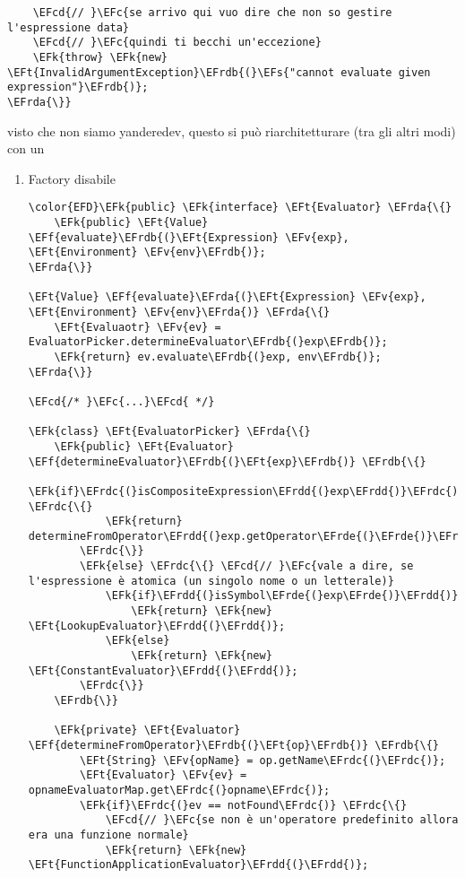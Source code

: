 \documentclass[11pt]{article}
\newcommand{\EFc}[1]{\textcolor{EFc}{#1}} %
\newcommand{\EFcd}[1]{\textcolor{EFcd}{#1}} %
\newcommand{\EFs}[1]{\textcolor{EFs}{#1}} %
\newcommand{\EFk}[1]{\textcolor{EFk}{#1}} %
\newcommand{\EFf}[1]{\textcolor{EFf}{#1}} %
\newcommand{\EFv}[1]{\textcolor{EFv}{#1}} %
\newcommand{\EFt}[1]{\textcolor{EFt}{#1}} %
\newcommand{\EFrda}[1]{\textcolor{EFrda}{#1}} %
\newcommand{\EFrdb}[1]{\textcolor{EFrdb}{#1}} %
\newcommand{\EFrdc}[1]{\textcolor{EFrdc}{#1}} %
\newcommand{\EFrdd}[1]{\textcolor{EFrdd}{#1}} %
\newcommand{\EFrde}[1]{\textcolor{EFrde}{#1}} %
\begin{document}
\begin{enumerate}
\begin{Code}
\begin{Verbatim}
    \EFcd{// }\EFc{se arrivo qui vuo dire che non so gestire l'espressione data}
    \EFcd{// }\EFc{quindi ti becchi un'eccezione}
    \EFk{throw} \EFk{new} \EFt{InvalidArgumentException}\EFrdb{(}\EFs{"cannot evaluate given expression"}\EFrdb{)};
\EFrda{\}}
\end{Verbatim}
\end{Code}
visto che non siamo yanderedev, questo si può riarchitetturare (tra gli altri modi) con un
\begin{enumerate}
\item Factory disabile
\label{sec:org60b07de}
\begin{Code}
\begin{Verbatim}
\color{EFD}\EFk{public} \EFk{interface} \EFt{Evaluator} \EFrda{\{}
    \EFk{public} \EFt{Value} \EFf{evaluate}\EFrdb{(}\EFt{Expression} \EFv{exp}, \EFt{Environment} \EFv{env}\EFrdb{)};
\EFrda{\}}

\EFt{Value} \EFf{evaluate}\EFrda{(}\EFt{Expression} \EFv{exp}, \EFt{Environment} \EFv{env}\EFrda{)} \EFrda{\{}
    \EFt{Evaluaotr} \EFv{ev} = EvaluatorPicker.determineEvaluator\EFrdb{(}exp\EFrdb{)};
    \EFk{return} ev.evaluate\EFrdb{(}exp, env\EFrdb{)};
\EFrda{\}}

\EFcd{/* }\EFc{...}\EFcd{ */}

\EFk{class} \EFt{EvaluatorPicker} \EFrda{\{}
    \EFk{public} \EFt{Evaluator} \EFf{determineEvaluator}\EFrdb{(}\EFt{exp}\EFrdb{)} \EFrdb{\{}
        \EFk{if}\EFrdc{(}isCompositeExpression\EFrdd{(}exp\EFrdd{)}\EFrdc{)} \EFrdc{\{}
            \EFk{return} determineFromOperator\EFrdd{(}exp.getOperator\EFrde{(}\EFrde{)}\EFrdd{)};
        \EFrdc{\}}
        \EFk{else} \EFrdc{\{} \EFcd{// }\EFc{vale a dire, se l'espressione è atomica (un singolo nome o un letterale)}
            \EFk{if}\EFrdd{(}isSymbol\EFrde{(}exp\EFrde{)}\EFrdd{)}
                \EFk{return} \EFk{new} \EFt{LookupEvaluator}\EFrdd{(}\EFrdd{)};
            \EFk{else}
                \EFk{return} \EFk{new} \EFt{ConstantEvaluator}\EFrdd{(}\EFrdd{)};
        \EFrdc{\}}
    \EFrdb{\}}

    \EFk{private} \EFt{Evaluator} \EFf{determineFromOperator}\EFrdb{(}\EFt{op}\EFrdb{)} \EFrdb{\{}
        \EFt{String} \EFv{opName} = op.getName\EFrdc{(}\EFrdc{)};
        \EFt{Evaluator} \EFv{ev} = opnameEvaluatorMap.get\EFrdc{(}opname\EFrdc{)};
        \EFk{if}\EFrdc{(}ev == notFound\EFrdc{)} \EFrdc{\{}
            \EFcd{// }\EFc{se non è un'operatore predefinito allora era una funzione normale}
            \EFk{return} \EFk{new} \EFt{FunctionApplicationEvaluator}\EFrdd{(}\EFrdd{)};


\end{Verbatim}
\end{Code}
\end{enumerate}
\end{enumerate}
\end{document}
